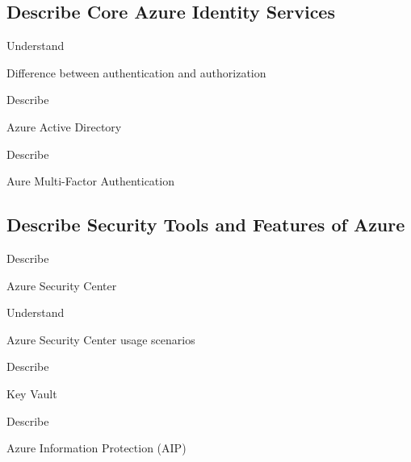 \documentclass{scrartcl}
\newenvironment{flashcard}[2][]{%
    #1
    \vfill
    \centerline{\Large{#2}}
    \vfill
    \newpage
}
{\newpage}
\newcommand{\subsectioncard}[1]{
    \vspace*{\stretch{1}}
    \subsection{#1}
    \vspace*{\stretch{1}}
    \pagebreak
}
\begin{document}
    \subsectioncard{Describe Core Azure Identity Services}

    \begin{flashcard}[Understand]{Difference between authentication and authorization}

    \end{flashcard}

    \begin{flashcard}[Describe]{Azure Active Directory}

    \end{flashcard}

    \begin{flashcard}[Describe]{Aure Multi-Factor Authentication}

    \end{flashcard}

    \subsectioncard{Describe Security Tools and Features of Azure}

    \begin{flashcard}[Describe]{Azure Security Center}

    \end{flashcard}

    \begin{flashcard}[Understand]{Azure Security Center usage scenarios}

    \end{flashcard}

    \begin{flashcard}[Describe]{Key Vault}

    \end{flashcard}

    \begin{flashcard}[Describe]{Azure Information Protection (AIP)}

    \end{flashcard}
\end{document}
